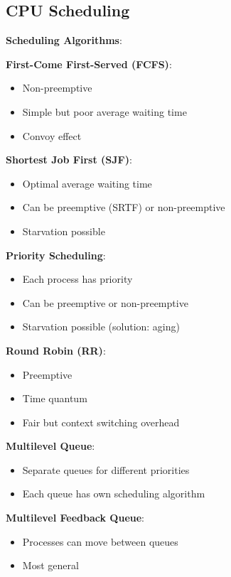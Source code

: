 \documentclass[12pt,a4paper]{report}
\begin{document}
\subsection{CPU Scheduling}
\begin{concept}
\textbf{Scheduling Algorithms}:

\textbf{First-Come First-Served (FCFS)}:
\begin{itemize}
    \item Non-preemptive
    \item Simple but poor average waiting time
    \item Convoy effect
\end{itemize}

\textbf{Shortest Job First (SJF)}:
\begin{itemize}
    \item Optimal average waiting time
    \item Can be preemptive (SRTF) or non-preemptive
    \item Starvation possible
\end{itemize}

\textbf{Priority Scheduling}:
\begin{itemize}
    \item Each process has priority
    \item Can be preemptive or non-preemptive
    \item Starvation possible (solution: aging)
\end{itemize}

\textbf{Round Robin (RR)}:
\begin{itemize}
    \item Preemptive
    \item Time quantum
    \item Fair but context switching overhead
\end{itemize}

\textbf{Multilevel Queue}:
\begin{itemize}
    \item Separate queues for different priorities
    \item Each queue has own scheduling algorithm
\end{itemize}

\textbf{Multilevel Feedback Queue}:
\begin{itemize}
    \item Processes can move between queues
    \item Most general
\end{itemize}
\end{concept}
\end{document}
